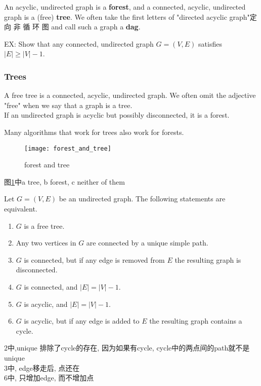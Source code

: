 \documentclass{article}
\begin{document}
An acyclic, undirected graph is a \textbf{forest},
and a connected, acyclic, undirected graph is a (free) \textbf{tree}. We often take the first letters of "directed acyclic graph"定向 非 循 环 图 and call such a graph a \textbf{dag}.

EX: Show that any connected, undirected graph $G = (V, E)$ satisfies $|E| \geq |V | - 1$.

\subsubsection{Trees}
A free tree is a connected, acyclic, undirected graph. We often omit the adjective "free" when we say that a graph is a tree. \\
If an undirected graph is acyclic but possibly disconnected, it is a forest.

Many algorithms that work for trees also work for forests.

\begin{figure}[htbp]
  \centering
  \texttt{[image: forest\_and\_tree]}\\
  \caption{forest and tree}\label{fig.forest_and_tree}
\end{figure}

图\ref{fig.forest_and_tree}中a tree, b forest, c neither of them

\begin{theorem}
 Let $G = (V, E)$ be an undirected graph. The following statements are equivalent.
\begin{enumerate}
	\item $G$ is a free tree.
	\item Any two vertices in $G$ are connected by a unique simple path.
	\item $G$ is connected, but if any edge is removed from $E$ the resulting graph is disconnected.
	\item $G$ is connected, and $|E| = |V | - 1$.
	\item $G$ is acyclic, and $|E| = |V | - 1$.
	\item $G$ is acyclic, but if any edge is added to $E$ the resulting graph contains a cycle.
\end{enumerate}
\end{theorem}
\noindent
2中,unique 排除了cycle的存在, 因为如果有cycle, cycle中的两点间的path就不是unique\\
3中, edge移走后, 点还在\\
6中, 只增加edge, 而不增加点
\end{document}
